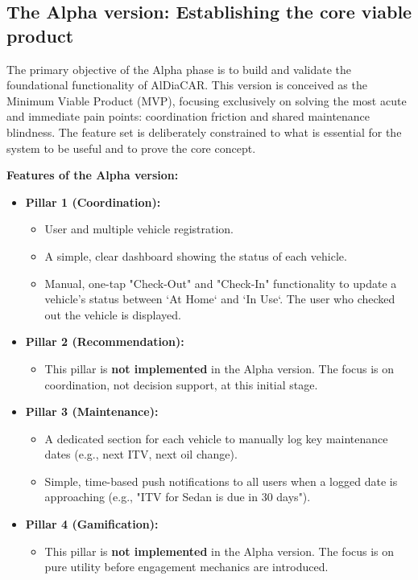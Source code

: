 \textgap

\subsection{The Alpha version: Establishing the core viable product}

The primary objective of the Alpha phase is to build and validate the foundational functionality of AlDiaCAR. This version is conceived as the Minimum Viable Product (MVP), focusing exclusively on solving the most acute and immediate pain points: coordination friction and shared maintenance blindness. The feature set is deliberately constrained to what is essential for the system to be useful and to prove the core concept.

\textgap

\textbf{Features of the Alpha version:}
\begin{itemize}
    \item \textbf{Pillar 1 (Coordination):}
    \begin{itemize}
        \item User and multiple vehicle registration.
        \item A simple, clear dashboard showing the status of each vehicle.
        \item Manual, one-tap "Check-Out" and "Check-In" functionality to update a vehicle's status between `At Home` and `In Use`. The user who checked out the vehicle is displayed.
    \end{itemize}
    \item \textbf{Pillar 2 (Recommendation):}
    \begin{itemize}
        \item This pillar is \textbf{not implemented} in the Alpha version. The focus is on coordination, not decision support, at this initial stage.
    \end{itemize}
    \item \textbf{Pillar 3 (Maintenance):}
    \begin{itemize}
        \item A dedicated section for each vehicle to manually log key maintenance dates (e.g., next ITV, next oil change).
        \item Simple, time-based push notifications to all users when a logged date is approaching (e.g., "ITV for Sedan is due in 30 days").
    \end{itemize}
    \item \textbf{Pillar 4 (Gamification):}
    \begin{itemize}
        \item This pillar is \textbf{not implemented} in the Alpha version. The focus is on pure utility before engagement mechanics are introduced.
    \end{itemize}
\end{itemize}

